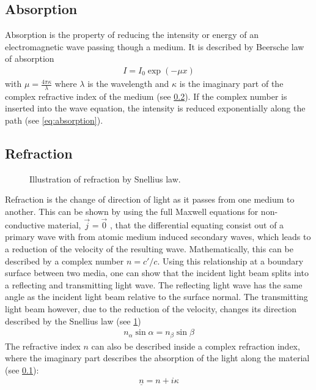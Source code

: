 \subsection{Absorption}\label{sec:theoAbsorption}
%
Absorption is the property of reducing the intensity or energy of an electromagnetic wave passing though a medium.
It is described by Beersche law of absorption
% 
\begin{align} 
    I = I_0 \exp(-\mu x) \label{eq:absorption}
\end{align}
%
with $\mu = \frac{4\pi \kappa}{\lambda}$ where $\lambda$ is the wavelength and $\kappa$ is the imaginary part of the complex refractive index of the medium (see \cref{sec:theoRefraction}).
If the complex number is inserted into the wave equation, the intensity is reduced exponentially along the path (see \cref{eq:absorption}).
%
% 
% 
\subsection{Refraction}\label{sec:theoRefraction}
%
\begin{figure}[!t]
\centering
\setlength{\tikzwidth}{\textwidth}
\caption{Illustration of refraction by Snellius law.}
\label{fig:optic_refraction}
\end{figure}
%
Refraction is the change of direction of light as it passes from one medium to another.
This can be shown by using the full Maxwell equations  for non-conductive material, \ie{} $\vec{j} = \vec{0}$ , that the differential equating consist out of a primary wave with from atomic medium induced secondary waves, which leads to a reduction of the velocity of the resulting wave.
Mathematically, this can be described by a complex number $n = c' / c$.
Using this relationship at a boundary surface between two media, one can show that the incident light beam splits into a reflecting and transmitting light wave.
The reflecting light wave has the same angle as the incident light beam relative to the surface normal.
The transmitting light beam however, due to the reduction of the velocity, changes its direction described by the Snellius law (see \cref{fig:optic_refraction})
\begin{align}
    n_\alpha \sin \alpha = n_\beta \sin \beta \label{eq:Snellius}
\end{align}
% 
The refractive index $n$ can also be described inside a complex refraction index, where the imaginary part describes the absorption of the light along the material (see \cref{sec:theoAbsorption}):
% 
\begin{align}
\underline{n} = n + i\kappa
\end{align}
% 
%
%
